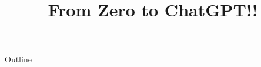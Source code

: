 \documentclass[xcolor=dvipsnames,compress,t,pdf,9pt]{beamer}
\title[\insertframenumber /\inserttotalframenumber]{From Zero to ChatGPT!!}
\begin{document}
	\begin{frame}
	\titlepage
	\end{frame}
	
	\begin{frame}{Outline}
	    \tableofcontents
	\end{frame}

	
	
	
	
	
	
\end{document}
